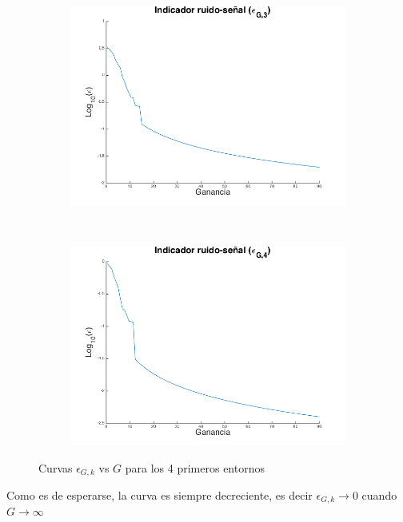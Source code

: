 \documentclass[letterpaper,11pt]{article}
\begin{document}
\begin{figure}[H]
\begin{subfigure}[b]{0.45\textwidth}
    \end{subfigure}
    ~
    \begin{subfigure}[b]{0.45\textwidth}
        \includegraphics[width=\textwidth]{img/parte_c/curva3.png}
    \end{subfigure}
    ~
    \begin{subfigure}[b]{0.45\textwidth}
        \includegraphics[width=\textwidth]{img/parte_c/curva4.png}
    \end{subfigure}
    \caption{Curvas $\epsilon_{G,k}$ vs $G$ para los 4 primeros entornos}   
    \label{partec1}
\end{figure}

Como es de esperarse, la curva es siempre decreciente, es decir $\epsilon_{G,k} \to 0$ cuando $G \to \infty$
\end{document}
